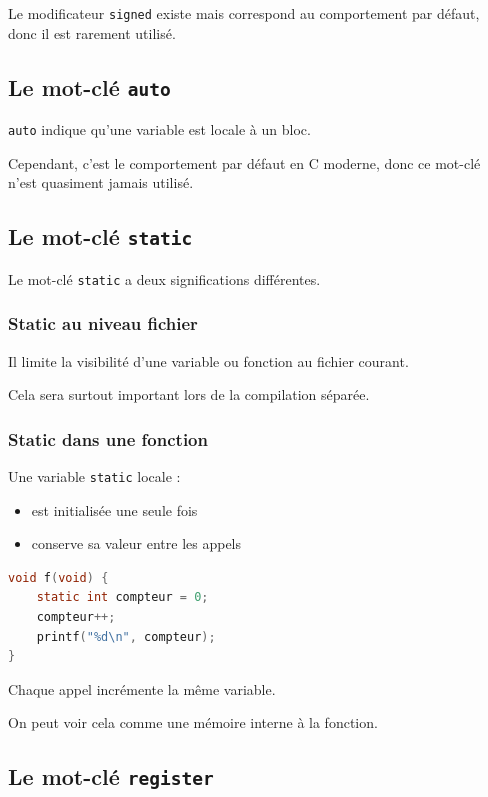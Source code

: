 Le modificateur \texttt{signed} existe mais correspond au comportement par défaut,
donc il est rarement utilisé.

\subsection{Le mot-clé \texttt{auto}}

\texttt{auto} indique qu’une variable est locale à un bloc.

Cependant, c’est le comportement par défaut en C moderne,
donc ce mot-clé n’est quasiment jamais utilisé.

\subsection{Le mot-clé \texttt{static}}

Le mot-clé \texttt{static} a deux significations différentes.

\subsubsection{Static au niveau fichier}

Il limite la visibilité d’une variable ou fonction au fichier courant.

Cela sera surtout important lors de la compilation séparée.

\subsubsection{Static dans une fonction}

Une variable \texttt{static} locale :

\begin{itemize}
    \item est initialisée une seule fois
    \item conserve sa valeur entre les appels
\end{itemize}

\begin{lstlisting}[language=C]
void f(void) {
    static int compteur = 0;
    compteur++;
    printf("%d\n", compteur);
}
\end{lstlisting}

Chaque appel incrémente la même variable.

On peut voir cela comme une mémoire interne à la fonction.

\subsection{Le mot-clé \texttt{register}}

